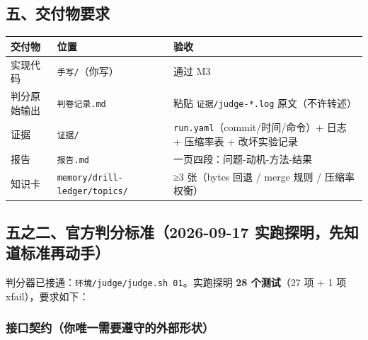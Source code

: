 \documentclass[
  chinese,
  11pt,
]{ctexart}
\newcounter{none} %
\begin{document}
\subsection{五、交付物要求}\label{ux4e94ux4ea4ux4ed8ux7269ux8981ux6c42}

{\def\LTcaptype{none} %
\begin{longtable}[]{@{}
  >{\raggedright\arraybackslash}p{}
  >{\raggedright\arraybackslash}p{}
  >{\raggedright\arraybackslash}p{}@{}}
\toprule\noalign{}
\begin{minipage}[b]{\linewidth}\raggedright
交付物
\end{minipage} & \begin{minipage}[b]{\linewidth}\raggedright
位置
\end{minipage} & \begin{minipage}[b]{\linewidth}\raggedright
验收
\end{minipage} \\
\midrule\noalign{}
\endhead
\bottomrule\noalign{}
\endlastfoot
实现代码 & \texttt{手写/}（你写） & 通过 M3 \\
判分原始输出 & \texttt{判卷记录.md} & 粘贴 \texttt{证据/judge-*.log} 原文（不许转述） \\
证据 & \texttt{证据/} & \texttt{run.yaml}（commit/时间/命令）+ 日志 + 压缩率表 + 改坏实验记录 \\
报告 & \texttt{报告.md} & 一页四段：问题-动机-方法-结果 \\
知识卡 & \texttt{memory/drill-ledger/topics/} & ≥3 张（bytes 回退 / merge 规则 / 压缩率权衡） \\
\end{longtable}
}

\subsection{\texorpdfstring{五之二、官方判分标准（2026-09-17 实跑探明，\textbf{先知道标准再动手}）}{五之二、官方判分标准（2026-09-17 实跑探明，先知道标准再动手）}}\label{ux4e94ux4e4bux4e8cux5b98ux65b9ux5224ux5206ux6807ux51c62026-09-17-ux5b9eux8dd1ux63a2ux660eux5148ux77e5ux9053ux6807ux51c6ux518dux52a8ux624b}

判分器已接通：\texttt{环境/judge/judge.sh\ 01}。实跑探明 \textbf{28 个测试}（27 项 + 1 项 xfail），要求如下：

\subsubsection{接口契约（你唯一需要遵守的外部形状）}\label{ux63a5ux53e3ux5951ux7ea6ux4f60ux552fux4e00ux9700ux8981ux9075ux5b88ux7684ux5916ux90e8ux5f62ux72b6}
\end{document}
